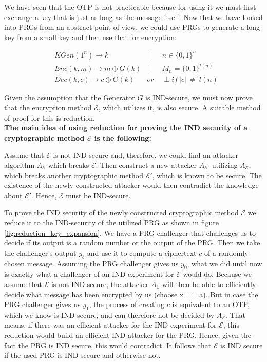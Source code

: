 We have seen that the OTP is not practicable because for using it we must first exchange a key that is just as long as the message itself. Now that we have looked into PRGs from an abstract point of view, we could use PRGs to generate a long key from a small key and then use that for encryption:

\begin{align}
     & KGen(1^n) \rightarrow k             & |\quad   & n \in \{0,1\}^n              \\
     & Enc(k,m)  \rightarrow m \oplus G(k) & |  \quad & M_n=\{0,1\}^{l(n)}           \\
     & Dec(k,c)  \rightarrow c \oplus G(k) & or \     & \perp if \ |c| \ \neq \ l(n)
\end{align}

Given the assumption that the Generator $G$ is IND-secure, we must now prove that the encryption method $\mathcal{E}$, which utilizes it, is also secure. A suitable method of proof for this is reduction.\\
\textbf{The main idea of using reduction for proving the IND security of a cryptographic method $\mathcal{E}$ is the following:}

Assume that $\mathcal{E}$ is not IND-secure and, therefore, we could find an attacker algorithm $A_{\mathcal{E}}$ which breaks $\mathcal{E}$. Then construct a new attacker $A_{\mathcal{E}'}$ utilizing $A_{\mathcal{E}}$, which breaks another cryptographic method $\mathcal{E}'$, which is known to be secure. The existence of the newly constructed attacker would then contradict the knowledge about $\mathcal{E}'$. Hence, $\mathcal{E}$ must be IND-secure.

To prove the IND security of the newly constructed cryptographic method $\mathcal{E}$ we reduce it to the IND-security of the utilized PRG as shown in figure \ref{fig:reduction_key_expansion}. We have a PRG challenger that challenges us to decide if its output is a random number or the output of the PRG. Then we take the challenger's output $y_b$ and use it to compute a ciphertext $c$ of a randomly chosen message. Assuming the PRG challenger gives us $y_0$, what we did until now is exactly what a challenger of an IND experiment for $\mathcal{E}$ would do. Because we assume that $\mathcal{E}$ is not IND-secure, the attacker $A_{\mathcal{E}}$ will then be able to efficiently decide what message has been encrypted by us (choose x == a). But in case the PRG challenger gives us $y_1$, the process of creating $c$ is equivalent to an OTP, which we know is IND-secure, and can therefore not be decided by $A_{\mathcal{E}}$. That means, if there was an efficient attacker for the IND experiment for $\mathcal{E}$, this reduction would build an efficient IND attacker for the PRG. Hence, given the fact the PRG is IND secure, this would contradict. It follows that $\mathcal{E}$ is IND secure if the used PRG is IND secure and otherwise not.

